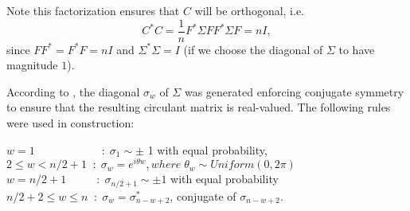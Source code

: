 	Note this factorization ensures that $C$ will be orthogonal, i.e.
	$$ C^*C=\dfrac{{1}}{n} F^* \Sigma F F^* \Sigma F = nI, $$
	since $FF^*=F^*F=nI$ and $\Sigma^* \Sigma = I$ (if we choose the diagonal of $\Sigma$ 
	to have magnitude $1$).
	
According to \cite{romberg2009}, the diagonal $\sigma_{w}$ of $\Sigma$ was generated enforcing conjugate symmetry to ensure that the resulting circulant matrix is real-valued. The following rules were used in construction:
    	
	$w=1\qquad \qquad \qquad : \; \sigma_{1} \sim \pm$ 1 with equal probability,
	\\[1em]
	$2 \le w < n/2+1 \; \; : \; \sigma_{w}=e^{i\theta w}, where \; {\theta}_{w} \sim Uniform(0,2\pi) $
	\\[1em]
	$w=n/2+1 \qquad \; \; \, : \; \sigma_{n/2+1} \sim \pm 1 $ with equal probability 
	\\[1em]
	$n/2+2 \le w \le n \; \; : \; \sigma_{w}=\sigma^{*}_{n-w+2}$, conjugate of  $\sigma_{n-w+2}$.
    
